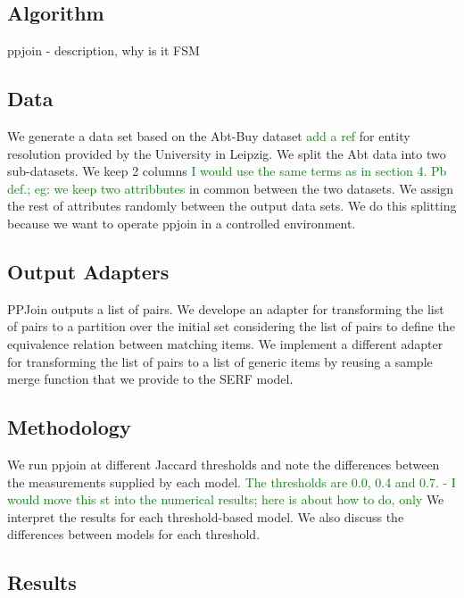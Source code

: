 \documentclass[11pt]{article}
\begin{document}
    \subsection[algo]{Algorithm}\label{subsec:algorithm}
    
    ppjoin - description, why is it FSM

    \subsection[data]{Data}\label{subsec:data}
    
    We generate a data set based on the Abt-Buy dataset 
    \textcolor{green}{add a ref} 
    for entity resolution provided by the University in Leipzig. We split the Abt data into two sub-datasets. We keep 2 columns
    \textcolor{green}{I would use the same terms as in section 4. Pb def.; eg: we keep two attribbutes} 
    in common between the two datasets. We assign the rest of attributes randomly between the output data sets. We do this splitting because we want to operate ppjoin in a controlled environment.

    \subsection[adapters]{Output Adapters}\label{subsec:adapters}

    PPJoin outputs a list of pairs. We develope an adapter for transforming the list of pairs to a partition over the initial set considering the list of pairs to define the equivalence relation between matching items. We implement a different adapter for transforming the list of pairs to a list of generic items by reusing a sample merge function that we provide to the SERF model.

    \subsection[method]{Methodology}\label{subsec:methodology}

    We run ppjoin at different Jaccard thresholds and note the differences between the measurements supplied by each model. 
    \textcolor{green}{The thresholds are 0.0, 0.4 and 0.7. - I would move this st into the numerical results; here is about how to do, only}     
    We interpret the results for each threshold-based model. We also discuss the differences between models for each threshold.

    \subsection[results]{Results}\label{subsec:results}
\end{document}
